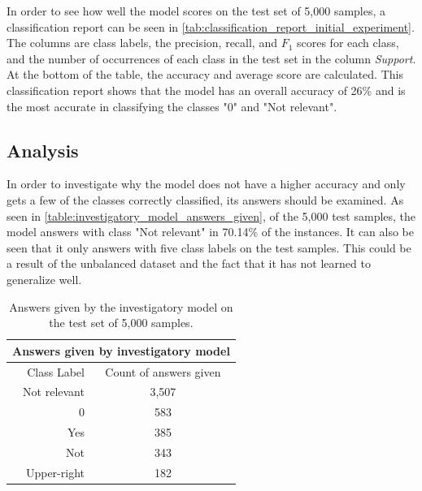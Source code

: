     In order to see how well the model scores on the test set of 5,000 samples, a classification report can be seen in \autoref{tab:classification_report_initial_experiment}.
    The columns are class labels, the precision, recall, and $F_1$ scores for each class, and the number of occurrences of each class in the test set in the column \textit{Support}. At the bottom of the table, the accuracy and average score are calculated.
    This classification report shows that the model has an overall accuracy of 26\% and is the most accurate in classifying the classes "0" and "Not relevant".
    


    \subsection{Analysis}
    In order to investigate why the model does not have a higher accuracy and only gets a few of the classes correctly classified, its answers should be examined.
    As seen in \autoref{table:investigatory_model_answers_given}, of the 5,000 test samples, the model answers with class "Not relevant" in 70.14\% of the instances. It can also be seen that it only answers with five class labels on the test samples. This could be a result of the unbalanced dataset and the fact that it has not learned to generalize well.

    \begin{table}[htb]
    \centering
    \begin{tabular}{ r c } 
        \multicolumn{2}{c}{\textbf{Answers given by investigatory model}}\\
        \toprule
           Class Label & Count of answers given \\
        \midrule
            Not relevant & 3,507\\
            0 & 583\\
            Yes & 385\\
            Not & 343 \\
            Upper-right & 182\\[0.5ex]
        \bottomrule
    \end{tabular}
    \caption[Answers given by the investigatory model on the test set.]{Answers given by the investigatory model on the test set of 5,000 samples.}
    \label{table:investigatory_model_answers_given}
    \end{table}
    
